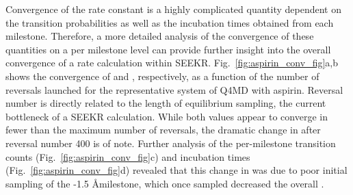 \par Convergence of the rate constant is a highly complicated quantity dependent
on the transition probabilities as well as the incubation times obtained from
each milestone. Therefore, a more detailed analysis of the convergence of
these quantities on a per milestone level can provide further insight into the
overall convergence of a rate calculation within SEEKR. Fig.~\ref{fig:aspirin_conv_fig}a,b shows the convergence
of \kon and \koff, respectively, as a function of the number of reversals
launched for the representative system of Q4MD \bcd with aspirin. Reversal number is directly related to the length of
equilibrium sampling, the current bottleneck of a SEEKR
calculation.
While both values appear to converge in fewer than the maximum
number of reversals, the dramatic change in \koff after
reversal number 400 is of note. Further analysis of the
per-milestone transition counts (Fig.~\ref{fig:aspirin_conv_fig}c) and
incubation times (Fig.~\ref{fig:aspirin_conv_fig}d) revealed
that this change in \koff was due to poor initial sampling of
the -1.5 \AA milestone, which once sampled decreased the overall \koff.

